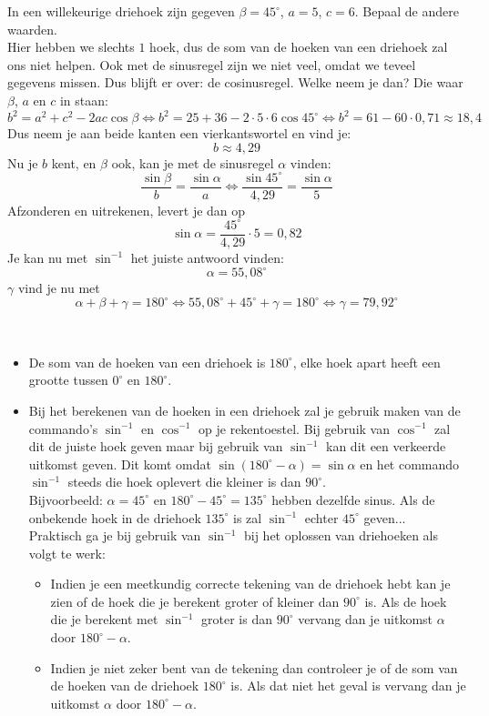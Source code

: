 \begin{voorbeeld}
	In een willekeurige driehoek zijn gegeven $\beta = 45^\circ$, $a = 5$, $c=6$. Bepaal de andere waarden.\\
Hier hebben we slechts $1$ hoek, dus de som van de hoeken van een driehoek zal ons niet helpen. Ook met de sinusregel zijn we niet veel, omdat we teveel gegevens missen. Dus blijft er over: de cosinusregel. Welke neem je dan? Die waar $\beta$, $a$ en $c$ in staan:
\[b^2=a^2+c^2-2ac\cos\beta \Leftrightarrow b^2 = 25+36-2\cdot5\cdot 6\cos 45^\circ \Leftrightarrow b^2 = 61-60 \cdot 0,71 \approx 18,4\]
Dus neem je aan beide kanten een vierkantswortel en vind je:
\[b \approx 4,29\]
Nu je $b$ kent, en $\beta$ ook, kan je met de sinusregel $\alpha$ vinden:
\[\frac{\sin \beta}{b}=\frac{\sin \alpha}{a}\Leftrightarrow \frac{\sin 45^\circ}{4,29}=\frac{\sin \alpha}{5}\]
Afzonderen en uitrekenen, levert je dan op
\[\sin \alpha = \frac{45^\circ}{4,29}\cdot 5 = 0,82\]
Je kan nu met $\sin^{-1}$ het juiste antwoord vinden:
\[\alpha=55,08^\circ\]
$\gamma$ vind je nu met
\[\alpha+\beta+\gamma=180^\circ\Leftrightarrow 55,08^\circ + 45^\circ + \gamma = 180^\circ \Leftrightarrow \gamma = 79,92^\circ\]
\end{voorbeeld}


\begin{opmerking}
	\ \\
	
	\begin{itemize}
        \item De som van de hoeken van een driehoek is $180^\circ$, elke hoek apart heeft een grootte tussen $0^\circ$ en $180^\circ$.
		\item Bij het berekenen van de hoeken in een driehoek zal je gebruik maken van de commando's $\sin^{-1}$ en $\cos^{-1}$ op je rekentoestel. Bij gebruik van $\cos^{-1}$ zal dit de juiste hoek geven maar bij gebruik van $\sin^{-1}$ kan dit een verkeerde uitkomst geven. Dit komt omdat $\sin(180^\circ -\alpha)=\sin\alpha$ en het commando $\sin^{-1}$ steeds die hoek oplevert die kleiner is dan $90^\circ$.\\ Bijvoorbeeld: $\alpha = 45^\circ$ en $180^\circ-45^\circ = 135^\circ$ hebben dezelfde sinus. Als de onbekende hoek in de driehoek $135^\circ$ is zal $\sin^{-1}$ echter $45^\circ$ geven... \\
Praktisch ga je bij gebruik van $\sin^{-1}$ bij het oplossen van driehoeken als volgt te werk:	
	
\begin{itemize}
	\item Indien je een meetkundig correcte tekening van de driehoek hebt kan je zien of de hoek die je berekent groter of kleiner dan $90^\circ$ is. Als de hoek die je berekent met $\sin^{-1}$ groter is dan $90^\circ$ vervang dan je uitkomst $\alpha$ door $180^\circ -\alpha$.
	\item Indien je niet zeker bent van de tekening dan controleer je of de som van de hoeken van de driehoek $180^\circ$ is. Als dat niet het geval is vervang dan je uitkomst $\alpha$ door $180^\circ -\alpha$.
\end{itemize}
	
\end{itemize}
\end{opmerking}

